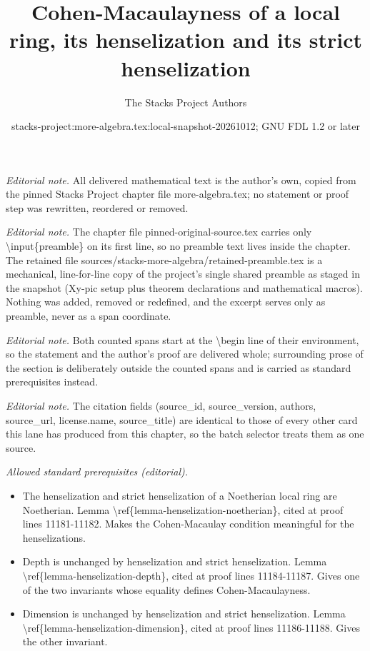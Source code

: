 \documentclass[10pt,a4paper]{amsart}
\title{Cohen-Macaulayness of a local ring, its henselization and its strict henselization}
\author{The Stacks Project Authors}
\date{stacks-project:more-algebra.tex:local-snapshot-20261012; GNU FDL 1.2 or later}
\theoremstyle{plain}
\theoremstyle{definition}
\theoremstyle{remark}
\numberwithin{equation}{subsection}
\begin{document}
\maketitle
\setcounter{subsection}{1}
\noindent\textit{Editorial note.} All delivered mathematical text is the author's own, copied from the pinned Stacks Project chapter file more-algebra.tex; no statement or proof step was rewritten, reordered or removed.\par\medskip
\noindent\textit{Editorial note.} The chapter file pinned-original-source.tex carries only \textbackslash{}input\{preamble\} on its first line, so no preamble text lives inside the chapter. The retained file sources/stacks-more-algebra/retained-preamble.tex is a mechanical, line-for-line copy of the project's single shared preamble as staged in the snapshot (Xy-pic setup plus theorem declarations and mathematical macros). Nothing was added, removed or redefined, and the excerpt serves only as preamble, never as a span coordinate.\par\medskip
\noindent\textit{Editorial note.} Both counted spans start at the \textbackslash{}begin line of their environment, so the statement and the author's proof are delivered whole; surrounding prose of the section is deliberately outside the counted spans and is carried as standard prerequisites instead.\par\medskip
\noindent\textit{Editorial note.} The citation fields (source\_id, source\_version, authors, source\_url, license.name, source\_title) are identical to those of every other card this lane has produced from this chapter, so the batch selector treats them as one source.\par\medskip
\noindent\textit{Allowed standard prerequisites (editorial).}\begin{itemize}
\item The henselization and strict henselization of a Noetherian local ring are Noetherian. Lemma \textbackslash{}ref\{lemma-henselization-noetherian\}, cited at proof lines 11181-11182. Makes the Cohen-Macaulay condition meaningful for the henselizations.
\item Depth is unchanged by henselization and strict henselization. Lemma \textbackslash{}ref\{lemma-henselization-depth\}, cited at proof lines 11184-11187. Gives one of the two invariants whose equality defines Cohen-Macaulayness.
\item Dimension is unchanged by henselization and strict henselization. Lemma \textbackslash{}ref\{lemma-henselization-dimension\}, cited at proof lines 11186-11188. Gives the other invariant.
\end{itemize}\medskip
\end{document}
